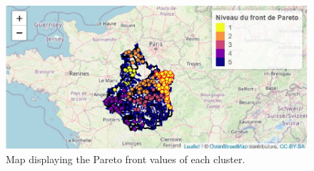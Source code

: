 \begin{figure}[htbp]
  \centering
  \includegraphics[]{figs/Chap6/Im_appbis7.pdf}
  \caption{Map displaying the Pareto front values of each cluster.}
  \label{fig:Imapp7}
\end{figure}

